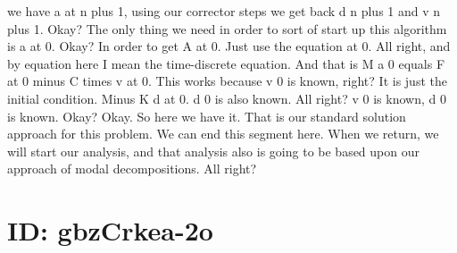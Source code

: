 \documentclass[10pt]{article}
\begin{document}
we have a at n plus 1, using our corrector steps we get back d n plus 1 and v n plus 1. Okay? The only thing we need in order to sort of start up this algorithm is a at 0. Okay? In order to get A at 0. Just use the equation at 0. All right, and by equation here I mean the time-discrete equation. And that is M a 0 equals F at 0 minus C times v at 0. This works because v 0 is known, right? It is just the initial condition. Minus K d at 0. d 0 is also known. All right? v 0 is known, d 0 is known. Okay? Okay. So here we have it. That is our standard solution approach for this problem. We can end this segment here. When we return, we will start our analysis, and that analysis also is going to be based upon our approach of modal decompositions. All right?

\section*{ID: gbzCrkea-2o}
\end{document}
